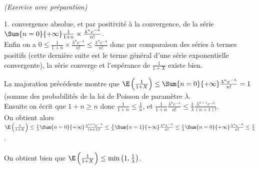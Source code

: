 \documentclass[11pt]{article}%
\begin{document}
\begin{exercice}{\it (Exercice avec préparation)}
\begin{noliste}{1.}
convergence absolue, et par positivité à la convergence, de la série
$\Sum{n = 0}{+ \infty} \frac{1}{1 + n} \times \frac{\lambda^{n}
e^{-\lambda} }{n!}$. \\
 Enfin on a $ 0 \leq \frac{1}{1 + n} \times \frac{\lambda^{n}
e^{-\lambda} }{n!} \leq \frac{\lambda^{n} e^{-\lambda} }{n!}$ donc par
comparaison des séries à termes positifs (cette dernière suite est le
terme général d'une série exponentielle convergente), la série converge
et l'espérance de $\frac{1}{1 + X}$ existe bien. \\
 \item La majoration précédente montre que $\E\left( \frac{1}{1 + X}
\right) \leq \Sum{n = 0}{+ \infty} \frac{\lambda^{n} e^{-\lambda} }{n!}
= 1$ (somme des probabilités de la loi de Poisson de paramètre
$\lambda$. \\
 Ensuite on écrit que $ 1 + n \geq n$ donc $\frac{1}{1 + n} \leq
\frac{1}{n}$, et $\frac{1}{1 + n} \frac{\lambda^{n} e^{-\lambda}}{n!}
\leq \frac{1}{\lambda} \frac{ \lambda^{n + 1} e^{- \lambda} }{(n +
1)!}$. \\
 On obtient alors $\E\left( \frac{1}{1 + X} \right) \leq
\frac{1}{\lambda} \Sum{n = 0}{+ \infty} \frac{ \lambda^{n + 1} e^{-
\lambda} }{(n + 1)!} \leq \frac{1}{\lambda} \Sum{n = 1}{+ \infty}
\frac{ \lambda^{n} e^{- \lambda} }{n!} \leq \frac{1}{\lambda} \Sum{n =
0}{+ \infty} \frac{ \lambda^{n} e^{- \lambda} }{n!} \leq
\frac{1}{\lambda}$. \\
\\
 On obtient bien que $\E\left( \frac{1}{1 + X} \right) \leq \min \left(
1, \frac{1}{\lambda} \right)$.
 \end{noliste}
 \end{exercice}

 \newpage
\end{document}
